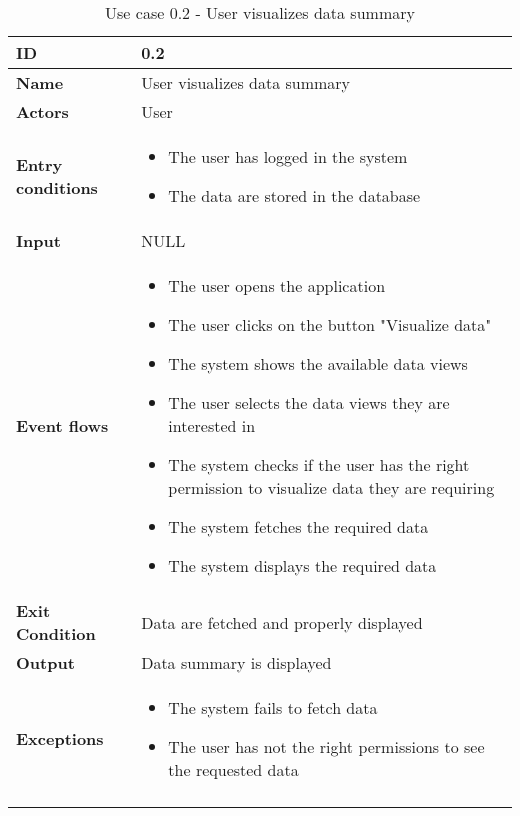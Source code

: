 \begin{longtable}[H]{ | l | p{10cm} | }
\hline
{\cellcolor[rgb]{0.753,0.753,0.753}}\textbf{ID}  & 0.2 \\ \hline
{\cellcolor[rgb]{0.753,0.753,0.753}}\textbf{Name} & User visualizes data summary \\ \hline
{\cellcolor[rgb]{0.753,0.753,0.753}}\textbf{Actors} & User \\ \hline
{\cellcolor[rgb]{0.753,0.753,0.753}}\textbf{Entry conditions} &
\begin{itemize}
    \item The user has logged in the system
    \item The data are stored in the database
\end{itemize}
\\ \hline
{\cellcolor[rgb]{0.753,0.753,0.753}}\textbf{Input} & NULL \\ \hline
{\cellcolor[rgb]{0.753,0.753,0.753}}\textbf{Event flows} &
\begin{itemize}
    \item The user opens the application
    \item The user clicks on the button "Visualize data"
    \item The system shows the available data views
    \item The user selects the data views they are interested in
    \item The system checks if the user has the right permission to visualize data they are requiring
    \item The system fetches the required data
    \item The system displays the required data
\end{itemize}
\\ \hline
{\cellcolor[rgb]{0.753,0.753,0.753}}\textbf{Exit Condition} & Data are fetched and properly displayed\\ \hline
{\cellcolor[rgb]{0.753,0.753,0.753}}\textbf{Output} & Data summary is displayed\\ \hline
{\cellcolor[rgb]{0.753,0.753,0.753}}\textbf{Exceptions} &
\begin{itemize}
    \item The system fails to fetch data
    \item The user has not the right permissions to see the requested data
\end{itemize}
\\ \hline
\caption{Use case 0.2 - User visualizes data summary}
\\
\end{longtable}